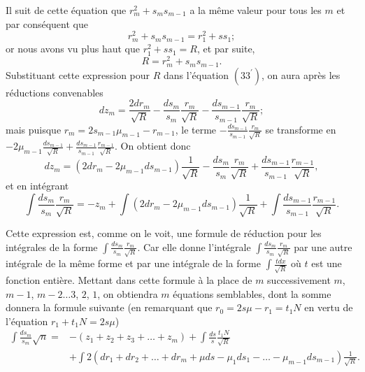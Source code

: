 \documentclass[oneside, 12 pt, leqno]{memoir}
\begin{document}
Il suit de cette équation que \(r_m^2+s_m s_{m-1}\) a la même valeur pour tous les \(m\) et par conséquent que
\[r_m^2+s_m s_{m-1}=r_1^2+s s_1;\]
or nous avons vu plus haut que \(r_1^2+s s_1=R\), et par suite,
\[\tag{34} R=r_m^2+s_m s_{m-1}.\]
Substituant cette expression pour \(R\) dans l'équation \(\left(33^{\prime}\right)\), on aura après les réductions convenables
\[d z_m=\frac{2 d r_m}{\sqrt{R}}-\frac{d s_m}{s_m} \frac{r_m}{\sqrt{R}}-\frac{d s_{m-1}}{s_{m-1}} \frac{r_m}{\sqrt{R}};\]
mais puisque \(r_m=2 s_{m-1} \mu_{m-1}-r_{m-1}\), le terme \(-\frac{d s_{m-1}}{s_{m-1}} \frac{r_m}{\sqrt{R}}\) se transforme en \(-2 \mu_{m-1} \frac{d s_{m-1}}{\sqrt{R}}+\frac{d s_{m-1}}{s_{m-1}} \frac{r_{m-1}}{\sqrt{R}}\). On obtient donc
\[d z_m=\left(2 d r_m-2 \mu_{m-1} d s_{m-1}\right) \frac{1}{\sqrt{R}}-\frac{d s_m}{s_m} \frac{r_m}{\sqrt{R}}+\frac{d s_{m-1}}{s_{m-1}} \frac{r_{m-1}}{\sqrt{R}},\]
et en intégrant
\[\tag{35}\int \frac{d s_m}{s_m} \frac{r_m}{\sqrt{R}}=-z_m+\int\left(2 d r_m-2 \mu_{m-1} d s_{m-1}\right) \frac{1}{\sqrt{R}}+\int \frac{d s_{m-1}}{s_{m-1}} \frac{r_{m-1}}{\sqrt{R}}.\]

Cette expression est, comme on le voit, une formule de réduction pour les intégrales de la forme \(\int \frac{d s_m}{s_m} \frac{r_m}{\sqrt{R}}\). Car elle donne l'intégrale \(\int \frac{d s_m}{s_m} \frac{r_m}{\sqrt{R}}\) par une autre intégrale de la même forme et par une intégrale de la forme \(\int \frac{t d x}{\sqrt{R}}\) où \(t\) est une fonction entière. Mettant dans cette formule à la place de \(m\) successivement \(m\), \(m-1\), \(m-2 \dots 3\), \(2\), \(1\), on obtiendra \(m\) équations semblables, dont la somme donnera la formule suivante (en remarquant que \(r_0=2 s\mu-r_1=t_1 N\) en vertu de l'équation \(r_1+t_1 N=2 s \mu\))
\[\begin{aligned}
\int \frac{d s_m}{s_m} \sqrt{n}=&-\left(z_1+z_2+z_3+\dots+z_m\right)+\int \frac{d s}{s} \frac{t_1 N}{\sqrt{R}} \\
&+\int 2\left(d r_1+d r_2+\dots+d r_m+\mu d s-\mu_1 d s_1-\dots-\mu_{m-1} d s_{m-1}\right) \frac{1}{\sqrt{R}}.
\end{aligned}\]
\end{document}

